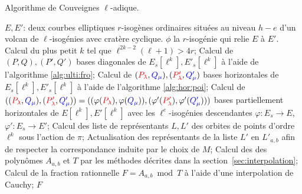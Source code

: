 \documentclass[10pt,a4paper]{book}
\theoremstyle{plain}
\theoremstyle{definition}
\theoremstyle{definition}
\theoremstyle{definition}
\theoremstyle{definition}
\theoremstyle{remark}
\theoremstyle{remark}
\theoremstyle{definition}
\begin{document}
\begin{algorithm}
\caption{\label{alg:cou:ell-adique} Algorithme de Couveignes $\ell$-adique.}
\begin{algorithmic}[1]
\REQUIRE $E,E'$: deux courbes elliptiques $r$-isogènes ordinaires situées au niveau $h-e$ d'un volcan de $\ell$-isogénies avec cratère cyclique.
\ENSURE $\phi$ la $r$-isogénie qui relie $E$ à $E'$.
\STATE Calcul du plus petit $k$ tel que $\ell^{2k-2}(\ell+1)>4r$;
\STATE  \label{alg:cou-ell:bdiag}
Calcul de $(P,Q),(P',Q')$ bases diagonales de $E_s[\ell^k],E'_s[\ell^k]$ à l'aide de l'algorithme \ref{alg:ulti:fro};
\STATE \label{alg:cou-ell:bhor}
Calcul de $(\color{red}P_{\lambda}\color{black},\color{blue}Q_{\mu}\color{black}),(\color{red}P'_{\lambda}\color{black},\color{blue}Q_{\mu}'\color{black})$ bases horizontales de $E_s[\ell^k],E'_s[\ell^k]$ à l'aide de l'algorithme \ref{alg:hor:poi};
\STATE Calcul de $((\color{red}P_{\lambda}\color{black},\color{blue}Q_{\mu}\color{black}),(\color{red}P'_{\lambda}\color{black},\color{blue}Q_{\mu}'\color{black}))=((\varphi(\color{red}P_{\lambda}\color{black}),\varphi(\color{blue}Q_{\mu}\color{black})),(\varphi'(\color{red}P'_{\lambda}\color{black}),\varphi'(\color{blue}Q_{\mu}'\color{black})))$ bases partiellement horizontales de $E[\ell^k],E'[\ell^k]$ avec les $\ell^e$-isogénies descendantes $\varphi: E_s \rightarrow E$, $\varphi': E_s \rightarrow E'$;
\ENDIF
\STATE \label{alg:cou-ell:rep} Calcul des liste de représentants $L,L'$ des orbites de points d'ordre $\ell^k$ sous l'action de $\pi$;
\STATE \label{alg:cou-ell:ord} Actualisation des représentants de la liste $L'$ en $L'_{a,b}$ afin de respecter la correspondance induite par le choix de $M$;
\STATE \label{alg:cou-ell:int} Calcul des des polynômes $A_{a,b}$ et $T$ par les méthodes décrites dans la section~\ref{sec:interpolation};
\STATE \label{alg:cou-ell:Cauchy} Calcul de la fraction rationnelle $F=A_{a,b} \bmod T$ à l'aide d'une interpolation de Cauchy;
\RETURN $F$
\ENDIF
\ENDFOR 
\end{algorithmic}
\end{algorithm}
\end{document}
